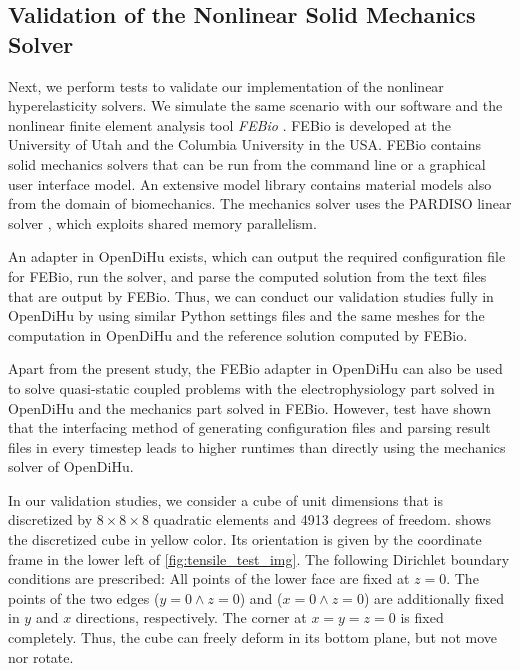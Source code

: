 \subsection{Validation of the Nonlinear Solid Mechanics Solver}\label{sec:validation_nonlinear}

Next, we perform tests to validate our implementation of the nonlinear hyperelasticity solvers.
We simulate the same scenario with our software and the nonlinear finite element analysis tool \emph{FEBio} \cite{Maas2012}.
FEBio is developed at the University of Utah and the Columbia University in the USA. FEBio contains solid mechanics solvers that can be run from the command line or a graphical user interface model. An extensive model library contains material models also from the domain of biomechanics. The mechanics solver uses the PARDISO linear solver \cite{pardiso2020}, which exploits shared memory parallelism.

An adapter in OpenDiHu exists, which can output the required configuration file for FEBio, run the solver, and parse the computed solution from the text files that are output by FEBio. Thus, we can conduct our validation studies fully in OpenDiHu by using similar Python settings files and the same meshes for the computation in OpenDiHu and the reference solution computed by FEBio.

Apart from the present study, the FEBio adapter in OpenDiHu can also be used to solve quasi-static coupled problems with the electrophysiology part solved in OpenDiHu and the mechanics part solved in FEBio. However, test have shown that the interfacing method of generating configuration files and parsing result files in every timestep leads to higher runtimes than directly using the mechanics solver of OpenDiHu.

In our validation studies, we consider a cube of unit dimensions that is discretized by $8\times 8 \times 8$ quadratic elements and 4913 degrees of freedom.  shows the discretized cube in yellow color. Its orientation is given by the coordinate frame in the lower left of \cref{fig:tensile_test_img}. 
The following Dirichlet boundary conditions are prescribed: All points of the lower face are fixed at $z=0$. The points of the two edges ($y=0 \wedge z=0$) and ($x=0 \wedge z=0$) are additionally fixed in $y$ and $x$ directions, respectively. The corner at $x=y=z=0$ is fixed completely. Thus, the cube can freely deform in its bottom plane, but not move nor rotate. 

